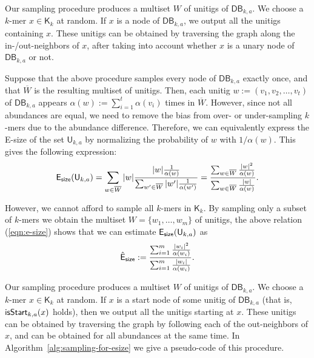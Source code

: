 \documentclass[a4paper,11pt]{article}
\newcommand{\kristoffer}[1]{{\color{red}{#1}}}
\newcommand{\alex}[1]{{\color{blue}{#1}}}
\newcommand{\DB}{\mathsf{DB}_{k,a}}
\newcommand{\U}{\mathsf{U}_{k,a}}
\newcommand{\K}{\mathsf{K}}
\newcommand{\abu}{\alpha}
\newcommand{\esize}{{\sf E_{size}}}
\newcommand{\isstart}{{\sf isStart}_{k,a}}
\begin{document}

\alex{OLD:} Our sampling procedure produces a multiset $W$ of unitigs of $\DB$. We choose a $k$-mer $x \in \K_k$ at random. If $x$ is a node of $\DB$, we output all the unitigs containing $x$. These unitigs can be obtained by traversing the graph along the in-/out-neighbors of $x$, after taking into account whether $x$ is a unary node of $\DB$ or not. 

Suppose that the above procedure samples every node of $\DB$ exactly once, and that $\overline{W}$ is the resulting multiset of unitigs. Then, each unitig $w := (v_1,v_2,\dots,v_t)$ of $\DB$ appears $\alpha(w) := \sum_{i = 1}^{t}\alpha(v_i)$ times in $\overline{W}$. However, since not all abundances are equal, we need to remove the bias from over- or under-sampling $k$-mers due to the abundance difference. Therefore, we can equivalently express the E-size of the set $\U$ by normalizing the probability of $w$ with $1/\abu(w)$. This gives the following expression:
\begin{equation}
\esize(\U) = \sum_{w \in \overline{W}} |w| \frac{|w|\frac{1}{\alpha(w)}}{\sum_{w' \in \overline{W}}|w'|\frac{1}{\alpha(w')}} = \frac{\sum_{w \in \overline{W}}\frac{|w|^2}{\alpha(w)}}{\sum_{w \in \overline{W}}\frac{|w|}{\alpha(w)}}.
\label{eqn:e-size}
\end{equation}

However, we cannot afford to sample all $k$-mers in $\K_k$. By sampling only a subset of $k$-mers we obtain the multiset $W = \{w_1,\dots,w_m\}$ of unitigs, the above relation (\ref{eqn:e-size}) shows that we can estimate $\esize(\U)$ as 
\[\hat{{\sf E}}_{\sf size} := \frac{\sum_{i = 1}^{m}\frac{|w_i|^2}{\alpha(w_i)}}{\sum_{i=1}^{m}\frac{|w_i|}{\alpha(w_i)}}.\]

\alex{NEW:} Our sampling procedure produces a multiset $W$ of unitigs of $\DB$. We choose a $k$-mer $x \in \K_k$ at random. If $x$ is a start node of some unitig of $\DB$ (that is, $\isstart(x)$ holds), then we output all the unitigs starting at $x$. These unitigs can be obtained by traversing the graph by following each of the out-neighbors of $x$, and can be obtained for all abundances at the same time. In Algorithm~\ref{alg:sampling-for-esize} we give a pseudo-code of this procedure. 
\end{document}
